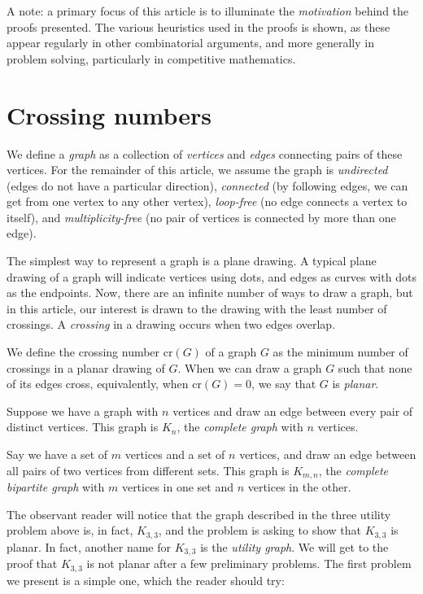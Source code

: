 \documentclass[11pt,paper=letter]{scrartcl}
\newcommand{\crs}[1]{\mathrm{cr}(#1)}
\begin{document}
A note: a primary focus of this article is to illuminate the \emph{motivation} behind the proofs presented. The various heuristics used in the proofs is shown, as these appear regularly in other combinatorial arguments, and more generally in problem solving, particularly in competitive mathematics.

\section{Crossing numbers}

We define a \emph{graph} as a collection of \emph{vertices} and \emph{edges} connecting pairs of these vertices. For the remainder of this article, we assume the graph is \emph{undirected} (edges do not have a particular direction), \emph{connected} (by following edges, we can get from one vertex to any other vertex), \emph{loop-free} (no edge connects a vertex to itself), and \emph{multiplicity-free} (no pair of vertices is connected by more than one edge).

The simplest way to represent a graph is a plane drawing. A typical plane drawing of a graph will indicate vertices using dots, and edges as curves with dots as the endpoints. Now, there are an infinite number of ways to draw a graph, but in this article, our interest is drawn to the drawing with the least number of crossings. A \emph{crossing} in a drawing occurs when two edges overlap.

We define the crossing number $\crs{G}$ of a graph $G$ as the minimum number of crossings in a planar drawing of $G$. When we can draw a graph $G$ such that none of its edges cross, equivalently, when $\crs{G} = 0$, we say that $G$ is \emph{planar}.

Suppose we have a graph with $n$ vertices and draw an edge between every pair of distinct vertices. This graph is $K_n$, the \emph{complete graph} with $n$ vertices.

Say we have a set of $m$ vertices and a set of $n$ vertices, and draw an edge between all pairs of two vertices from different sets. This graph is $K_{m, n}$, the \emph{complete bipartite graph} with $m$ vertices in one set and $n$ vertices in the other.

The observant reader will notice that the graph described in the three utility problem above is, in fact, $K_{3, 3}$, and the problem is asking to show that $K_{3, 3}$ is planar. In fact, another name for $K_{3,3}$ is the \emph{utility graph}. We will get to the proof that $K_{3, 3}$ is not planar after a few preliminary problems. The first problem we present is a simple one, which the reader should try:
\end{document}
